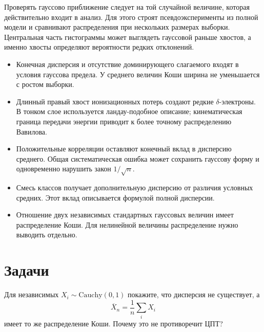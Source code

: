 \documentclass[
  russian,
  11pt,
  a4paper,
  open=any]{scrbook}
\providecommand{\tightlist}{%
  \setlength{\itemsep}{0pt}\setlength{\parskip}{0pt}}
\begin{document}
Проверять гауссово приближение следует на той случайной величине,
которая действительно входит в анализ. Для этого строят
псевдоэксперименты из полной модели и сравнивают распределения при
нескольких размерах выборки. Центральная часть гистограммы может
выглядеть гауссовой раньше хвостов, а именно хвосты определяют
вероятности редких отклонений.

\begin{bookchaptersummary}

\begin{itemize}
\tightlist
\item
  Конечная дисперсия и отсутствие доминирующего слагаемого входят в
  условия гауссова предела. У среднего величин Коши ширина не
  уменьшается с ростом выборки.
\item
  Длинный правый хвост ионизационных потерь создают редкие
  \(\delta\)-электроны. В тонком слое используется ландау-подобное
  описание; кинематическая граница передачи энергии приводит к более
  точному распределению Вавилова.
\item
  Положительные корреляции оставляют конечный вклад в дисперсию
  среднего. Общая систематическая ошибка может сохранить гауссову форму
  и одновременно нарушить закон \(1/\sqrt n\).
\item
  Смесь классов получает дополнительную дисперсию от различия условных
  средних. Этот вклад описывается формулой полной дисперсии.
\item
  Отношение двух независимых стандартных гауссовых величин имеет
  распределение Коши. Для нелинейной величины распределение нужно
  выводить отдельно.
\end{itemize}

\end{bookchaptersummary}

\section{Задачи}\label{ux437ux430ux434ux430ux447ux438-4}

\begin{semanticpdfbox}[colback=BookCoralSoft,borderline west={1.2mm}{0pt}{BookCoral}]

\par\nopagebreak[4]\vspace{1.2mm}

Для независимых \(X_i\sim\mathrm{Cauchy}(0,1)\) покажите, что дисперсия
не существует, а \[
\overline X_n=\frac{1}{n}\sum_iX_i
\] имеет то же распределение Коши. Почему это не противоречит ЦПТ?

\end{semanticpdfbox}
\end{document}
